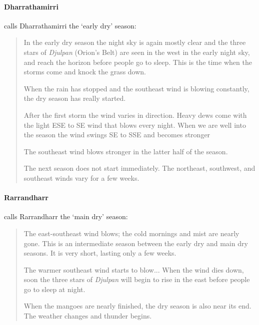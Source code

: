 \paragraph{Dharrathamirri}

\citet{davis1989} calls Dharrathamirri the `early dry' season:
\blockquote{
    In the early dry season the night sky is again mostly clear and the three stars of
    \textit{Djulpan} (Orion's Belt) are seen in the west in the early night sky,
    and reach the horizon before people go to sleep.
    This is the time when the storms come and knock the grass down.
    
    When the rain has stopped and the southeast wind is blowing constantly, the dry season has really started.
    
    After the first storm the wind varies in direction.
    Heavy dews come with the light ESE to SE wind that blows every night.
    When we are well into the season the wind swings SE to SSE and becomes stronger
    
    The southeast wind blows stronger in the latter half of the season.
    
    The next season does not start immediately.
    The northeast, southwest, and southeast winds vary for a few weeks.
}


\paragraph{Rarrandharr}

\citet{davis1989} calls Rarrandharr the `main dry' season:
\blockquote{
    The east-southeast wind blows; the cold mornings and mist are nearly gone.
    This is an intermediate season between the early dry and main dry seasons.
    It is very short, lasting only a few weeks.
    
    The warmer southeast wind starts to blow...
    When the wind dies down, soon the three stars of \textit{Djulpan} will begin to rise in the east before people go to sleep at night.
    
    When the mangoes are nearly finished, the dry season is also near its end.
    The weather changes and thunder begins.
}








